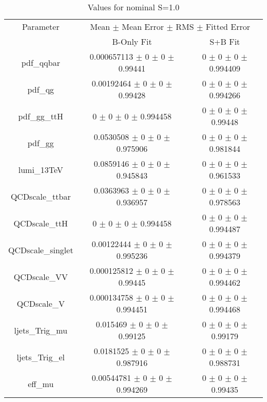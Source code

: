 \begin{table}
\centering
\caption{Values for nominal S=1.0}
\begin{tabular}{ccc}
\toprule
Parameter & \multicolumn{2}{c}{Mean $\pm$ Mean Error $\pm$ RMS $\pm$ Fitted Error}\\
 & B-Only Fit & S+B Fit\\
\midrule
pdf\_qqbar & \num{0.000657113} $\pm$ \num{0} $\pm$ \num{0} $\pm$ \num{0.99441} & \num{0} $\pm$ \num{0} $\pm$ \num{0} $\pm$ \num{0.994409}\\
pdf\_qg & \num{0.00192464} $\pm$ \num{0} $\pm$ \num{0} $\pm$ \num{0.99428} & \num{0} $\pm$ \num{0} $\pm$ \num{0} $\pm$ \num{0.994266}\\
pdf\_gg\_ttH & \num{0} $\pm$ \num{0} $\pm$ \num{0} $\pm$ \num{0.994458} & \num{0} $\pm$ \num{0} $\pm$ \num{0} $\pm$ \num{0.99448}\\
pdf\_gg & \num{0.0530508} $\pm$ \num{0} $\pm$ \num{0} $\pm$ \num{0.975906} & \num{0} $\pm$ \num{0} $\pm$ \num{0} $\pm$ \num{0.981844}\\
lumi\_13TeV & \num{0.0859146} $\pm$ \num{0} $\pm$ \num{0} $\pm$ \num{0.945843} & \num{0} $\pm$ \num{0} $\pm$ \num{0} $\pm$ \num{0.961533}\\
QCDscale\_ttbar & \num{0.0363963} $\pm$ \num{0} $\pm$ \num{0} $\pm$ \num{0.936957} & \num{0} $\pm$ \num{0} $\pm$ \num{0} $\pm$ \num{0.978563}\\
QCDscale\_ttH & \num{0} $\pm$ \num{0} $\pm$ \num{0} $\pm$ \num{0.994458} & \num{0} $\pm$ \num{0} $\pm$ \num{0} $\pm$ \num{0.994487}\\
QCDscale\_singlet & \num{0.00122444} $\pm$ \num{0} $\pm$ \num{0} $\pm$ \num{0.995236} & \num{0} $\pm$ \num{0} $\pm$ \num{0} $\pm$ \num{0.994379}\\
QCDscale\_VV & \num{0.000125812} $\pm$ \num{0} $\pm$ \num{0} $\pm$ \num{0.99445} & \num{0} $\pm$ \num{0} $\pm$ \num{0} $\pm$ \num{0.994462}\\
QCDscale\_V & \num{0.000134758} $\pm$ \num{0} $\pm$ \num{0} $\pm$ \num{0.994451} & \num{0} $\pm$ \num{0} $\pm$ \num{0} $\pm$ \num{0.994468}\\
ljets\_Trig\_mu & \num{0.015469} $\pm$ \num{0} $\pm$ \num{0} $\pm$ \num{0.99125} & \num{0} $\pm$ \num{0} $\pm$ \num{0} $\pm$ \num{0.99179}\\
ljets\_Trig\_el & \num{0.0181525} $\pm$ \num{0} $\pm$ \num{0} $\pm$ \num{0.987916} & \num{0} $\pm$ \num{0} $\pm$ \num{0} $\pm$ \num{0.988731}\\
eff\_mu & \num{0.00544781} $\pm$ \num{0} $\pm$ \num{0} $\pm$ \num{0.994269} & \num{0} $\pm$ \num{0} $\pm$ \num{0} $\pm$ \num{0.99435}\\

\end{tabular}
\end{table}
